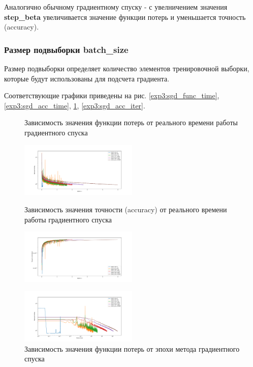 \documentclass[a4paper, 11pt]{article}
\begin{document}
           Аналогично обычному градиентному спуску - с увелничением значения \textbf{step\_beta} увеличивается значение функции потерь и уменьшается точность (accuracy).
            
            \subsubsection{Размер подвыборки batch\_size}
                Размер подвыборки определяет количество элементов тренировочной выборки, которые будут использованы для подсчета градиента.
            
            Соответствующие графики приведены на рис. \ref{exp3:sgd_func_time}, \ref{exp3:sgd_acc_time}, \ref{exp3:sgd_func_iter}, \ref{exp3:sgd_acc_iter}.
            \begin{figure}[H] \label{exp1}
                \begin{multicols}{2}
                    \begin{center}
                        \caption{Зависимость значения функции потерь от реального времени работы градиентного спуска} \label{exp3:sgd_func_time}
                        \includegraphics[width=0.5\textwidth, height=0.25\textheight]{../graphs/exp3_func_SGD_bs_time_alpha=1_beta=0,01.pdf}
                        
                        \caption{Зависимость значения точности (accuracy) от реального времени работы градиентного спуска} \label{exp3:sgd_acc_time}
                        \includegraphics[width=0.5\textwidth, height=0.25\textheight]{../graphs/exp3_accuracy_SGD_bs_time_alpha=1_beta=0,01.pdf}
                        
                        \caption{Зависимость значения функции потерь от эпохи метода градиентного спуска} \label{exp3:sgd_func_iter}
                        \includegraphics[width=0.5\textwidth, height=0.25\textheight]{../graphs/exp3_func_SGD_bs_epoch_num_alpha=1_beta=0,01.pdf}
                        

\end{center}
\end{multicols}
\end{figure}
\end{document}
